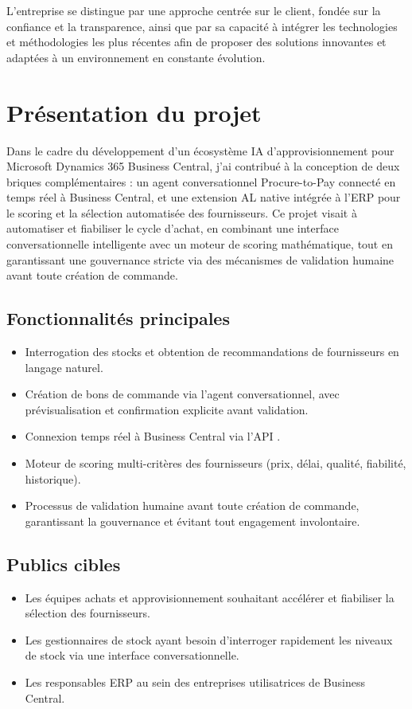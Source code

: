 L'entreprise se distingue par une approche centrée sur le client, fondée sur la confiance et la transparence, ainsi que par sa capacité à intégrer les technologies et méthodologies les plus récentes afin de proposer des solutions innovantes et adaptées à un environnement en constante évolution.

\section{Présentation du projet}

Dans le cadre du développement d'un écosystème IA d'approvisionnement pour Microsoft Dynamics 365 Business Central, j'ai contribué à la conception de deux briques complémentaires : un agent conversationnel Procure-to-Pay connecté en temps réel à Business Central, et une extension AL native intégrée à l'ERP pour le scoring et la sélection automatisée des fournisseurs. Ce projet visait à automatiser et fiabiliser le cycle d'achat, en combinant une interface conversationnelle intelligente avec un moteur de scoring mathématique, tout en garantissant une gouvernance stricte via des mécanismes de validation humaine avant toute création de commande.

\subsection{Fonctionnalités principales}
\begin{itemize}
    \item Interrogation des stocks et obtention de recommandations de fournisseurs en langage naturel.
    \item Création de bons de commande via l'agent conversationnel, avec prévisualisation et confirmation explicite avant validation.
    \item Connexion temps réel à Business Central via l'API .
    \item Moteur de scoring multi-critères des fournisseurs (prix, délai, qualité, fiabilité, historique).
    \item Processus de validation humaine avant toute création de commande, garantissant la gouvernance et évitant tout engagement involontaire.
\end{itemize}

\subsection{Publics cibles}
\begin{itemize}
    \item Les équipes achats et approvisionnement souhaitant accélérer et fiabiliser la sélection des fournisseurs.
    \item Les gestionnaires de stock ayant besoin d'interroger rapidement les niveaux de stock via une interface conversationnelle.
    \item Les responsables ERP au sein des entreprises utilisatrices de Business Central.
\end{itemize}

